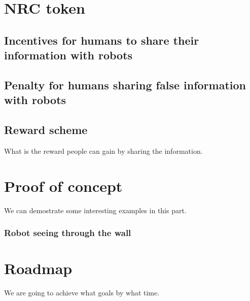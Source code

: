 \documentclass{article}
\begin{document}
\section{NRC token}

\subsection{Incentives for humans to share their information 
    with robots}


\subsection{Penalty for humans sharing false information 
    with robots}


\subsection{Reward scheme}
What is the reward people can gain by sharing the information.


\section{Proof of concept}
\label{sec:proof-concept}

We can demostrate some interesting examples in this part.

\subsubsection{Robot seeing through the wall}


\section{Roadmap}
\label{sec:roadmap}

We are going to achieve what goals by what time.





\small



\end{document}
